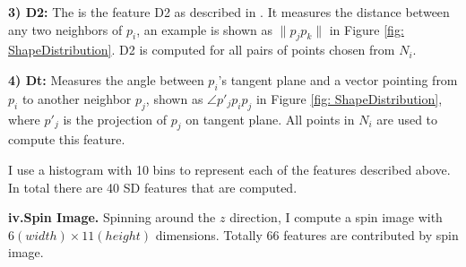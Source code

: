 \documentclass{iitthesis}
\begin{document}
\noindent \textbf{3) D2:} The is the feature D2 as described in \cite{RO02}. It measures the distance between any two neighbors of $p_i$, an example is shown as $\|p_j p_k\|$ in Figure \ref{fig: ShapeDistribution}. D2 is computed for all pairs of points chosen from $N_i$.

\noindent \textbf{4) Dt:} Measures the angle between $p_i$'s tangent plane and a vector pointing from $p_i$ to another neighbor $p_j$, shown as $\angle{p'_j p_i p_j}$ in Figure \ref{fig: ShapeDistribution}, where $p'_j$ is the projection of $p_j$ on tangent plane. All points in $N_i$ are used to compute this feature.

I use a histogram with 10 bins to represent each of the features described above. In total there are 40 SD features that are computed.

\noindent\textbf{iv.\;Spin Image.}  
Spinning around the $z$ direction, I compute a spin image \cite{JA:99} with $6(width)\times 11(height)$ dimensions. Totally $66$ features are contributed by spin image.
\end{document}
